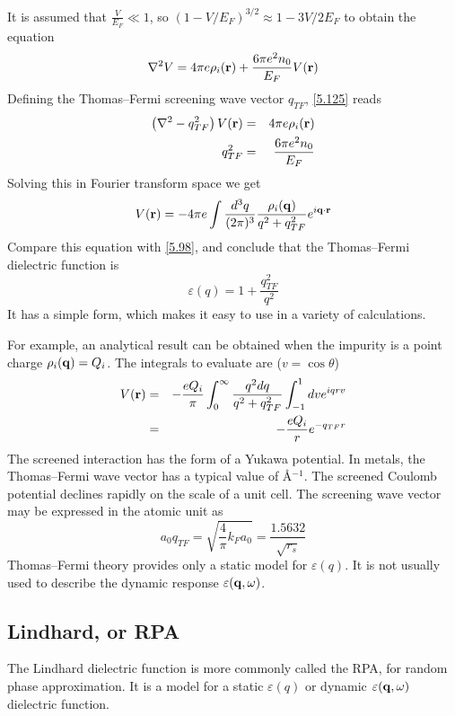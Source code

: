 It is assumed that $ \frac{V}{E_F} \ll 1$, so $(1-V/E_F)^{3/2} \approx 1- 3V/2E_F$ to obtain the equation
\begin{equation}
    \nabla^2 V = 4\pi e \rho_i(\mathbf{r}) + \frac{6\pi e^2 n_0}{E_F} V(\mathbf{r})   \label{5.125}
\end{equation}
Defining the Thomas--Fermi screening wave vector $q_{TF}$, \eqref{5.125} reads
\begin{eqnarray}
    \left( \nabla^2 - q^2_{TF} \right) V(\mathbf{r}) &=& 4\pi e \rho_i(\mathbf{r}) \label{5.126}  \\
    q^2_{TF} &=& \frac{6\pi e^2 n_0}{E_F} \label{5.127}
\end{eqnarray}
Solving this in Fourier transform space we get
\begin{equation}
    V(\mathbf{r}) = - 4 \pi e \int \frac{d^3q}{(2\pi)^3} \frac{\rho_i(\mathbf{q})}{q^2 + q^2_{TF}} e^{i\mathbf{q} \cdot \mathbf{r}} \label{5.128}
\end{equation}
Compare this equation with \eqref{5.98}, and conclude that the Thomas--Fermi dielectric function is
\begin{equation}
    \varepsilon(q) = 1 + \frac{q^2_{TF}}{q^2} \label{5.129}
\end{equation}
It has a simple form, which makes it easy to use in a variety of calculations.

For example, an analytical result can be obtained when the impurity is a point charge $\rho_i(\mathbf{q})=Q_i$. The integrals to evaluate are ($v = \cos\theta$)
\begin{eqnarray}
    V(\mathbf{r}) &=& - \frac{eQ_i }{\pi} \int_0^\infty \frac{q^2 dq}{q^2+ q^2_{TF}} \int_{-1}^1 dv e^{iqrv} \nonumber \\
    &=& - \frac{e Q_i}{r} e^{-q_{TF} r} \label{5.133}
\end{eqnarray}
The screened interaction has the form of a Yukawa potential.
In metals, the Thomas--Fermi wave vector has a typical value of {\AA}$^{-1}$.
The screened Coulomb potential declines rapidly on the scale of a unit cell.
The screening wave vector may be expressed in the atomic unit as
\begin{equation}
    a_0 q_{TF} = \sqrt{ \frac{4}{\pi} k_F a_0 } = \frac{1.5632}{\sqrt{r_s}} \label{5.134}
\end{equation}
Thomas--Fermi theory provides only a static model for $\varepsilon(q)$. It is not usually used to describe the dynamic response $\varepsilon(\mathbf{q},\omega)$.

\subsection{Lindhard, or RPA}
The Lindhard dielectric function is more commonly called the RPA, for random phase approximation.
It is a model for a static $\varepsilon(q)$ or dynamic $\varepsilon(\mathbf{q},\omega)$ dielectric function.

